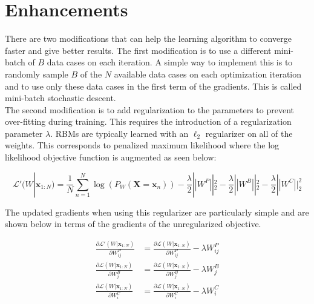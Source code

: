 \documentclass[11pt]{article}
\newcommand{\deriv}[2]{\frac{\partial{#1}}{\partial {#2}} }
\newcommand{\mbf}[1]{{\mathbf{#1}}}
\begin{document}
\section{Enhancements} 
There are two modifications that can help the learning algorithm to converge faster and give better results. The first modification is to use a different mini-batch of $B$ data cases on each iteration. A simple way to implement this is to randomly sample $B$ of the $N$ available data cases on each optimization iteration and to use only these data cases in the  first term of the gradients. 
This is called mini-batch stochastic descent. \\

The second modification is to add regularization to the parameters to prevent over-fitting during training. This requires the introduction of a regularization parameter $\lambda$. RBMs are typically learned
with an $\ell_2$ regularizer on all of the weights. This corresponds to penalized maximum likelihood where
the log likelihood objective function is  augmented as seen below:

$$
\mathcal{L}'(W|\mbf{x}_{1:N})=\frac{1}{N}\sum_{n=1}^N\log(P_W(\mbf{X}=\mbf{x}_n))
-\frac{\lambda}{2}||W^P||_2^2 - \frac{\lambda}{2}||W^B||_2^2
- \frac{\lambda}{2}||W^C||_2^2
$$

The updated gradients when using this regularizer are particularly simple and are shown below
in terms of the gradients of the unregularized objective.

\begin{align}
\deriv{\mathcal{L}'(W|\mbf{x}_{1:N})}{W^P_{ij}}
&= \deriv{\mathcal{L}(W|\mbf{x}_{1:N})}{W^P_{ij}} - \lambda W^P_{ij}\\
%
\deriv{\mathcal{L}(W|\mbf{x}_{1:N})}{W^B_{j}}
&=\deriv{\mathcal{L}(W|\mbf{x}_{1:N})}{W^B_{j}} - \lambda W^B_{j}\\
%
\deriv{\mathcal{L}(W|\mbf{x}_{1:N})}{W^C_{i}}
&= \deriv{\mathcal{L}(W|\mbf{x}_{1:N})}{W^C_{i}} - \lambda W^C_{i}
\end{align}
\end{document}
